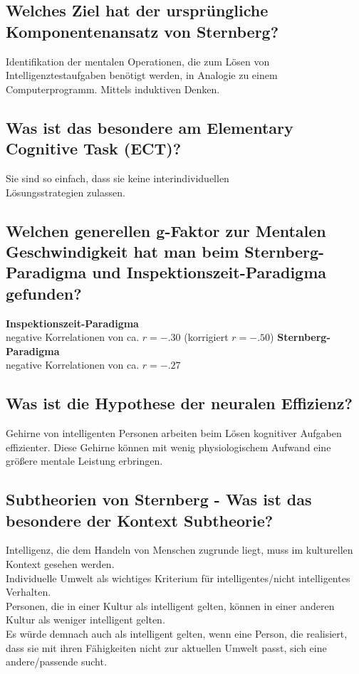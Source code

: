 \documentclass[a6paper,9pt,DIV=14]{scrartcl}
\begin{document}
\subsection{Welches Ziel hat der ursprüngliche Komponentenansatz von Sternberg?}
Identifikation der mentalen Operationen, die zum Lösen von Intelligenztestaufgaben benötigt werden, in Analogie zu einem Computerprogramm. Mittels induktiven Denken.
\subsection{Was ist das besondere am Elementary Cognitive Task (ECT)?} %
Sie sind so einfach, dass sie keine interindividuellen\\
Lösungsstrategien zulassen.
\subsection{Welchen generellen g-Faktor zur Mentalen Geschwindigkeit hat man beim Sternberg-Paradigma und Inspektionszeit-Paradigma gefunden?} %
    \textbf{Inspektionszeit-Paradigma}\\
    negative Korrelationen von ca. $r = -.30$ (korrigiert $r = -.50$)
    \textbf{Sternberg-Paradigma}\\
    negative Korrelationen von ca. $r = -.27$
\subsection{Was ist die Hypothese der neuralen Effizienz?} %
Gehirne von intelligenten Personen arbeiten beim Lösen kognitiver Aufgaben effizienter. Diese Gehirne können mit wenig physiologischem Aufwand eine größere mentale Leistung erbringen.
\subsection{Subtheorien von Sternberg - Was ist das besondere der Kontext Subtheorie?}
Intelligenz, die dem Handeln von Menschen zugrunde liegt, muss im kulturellen Kontext gesehen werden.\\
Individuelle Umwelt als wichtiges Kriterium für intelligentes/nicht intelligentes
Verhalten.\\
Personen, die in einer Kultur als intelligent gelten, können in einer anderen Kultur als weniger intelligent gelten.\\
Es würde demnach auch als intelligent gelten, wenn eine Person, die realisiert,
dass sie mit ihren Fähigkeiten nicht zur aktuellen Umwelt passt, sich eine
andere/passende sucht.
\end{document}
